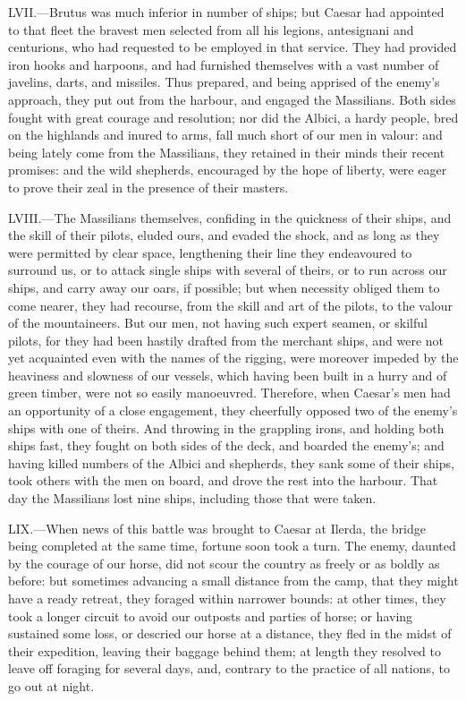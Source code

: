 LVII.—Brutus was much inferior in number of ships; but Caesar had
appointed to that fleet the bravest men selected from all his legions,
antesignani and centurions, who had requested to be employed in that
service. They had provided iron hooks and harpoons, and had furnished
themselves with a vast number of javelins, darts, and missiles. Thus
prepared, and being apprised of the enemy's approach, they put out from
the harbour, and engaged the Massilians. Both sides fought with great
courage and resolution; nor did the Albici, a hardy people, bred on the
highlands and inured to arms, fall much short of our men in valour: and
being lately come from the Massilians, they retained in their minds
their recent promises: and the wild shepherds, encouraged by the hope of
liberty, were eager to prove their zeal in the presence of their
masters.

LVIII.—The Massilians themselves, confiding in the quickness of their
ships, and the skill of their pilots, eluded ours, and evaded the shock,
and as long as they were permitted by clear space, lengthening their
line they endeavoured to surround us, or to attack single ships with
several of theirs, or to run across our ships, and carry away our oars,
if possible; but when necessity obliged them to come nearer, they had
recourse, from the skill and art of the pilots, to the valour of the
mountaineers. But our men, not having such expert seamen, or skilful
pilots, for they had been hastily drafted from the merchant ships, and
were not yet acquainted even with the names of the rigging, were
moreover impeded by the heaviness and slowness of our vessels, which
having been built in a hurry and of green timber, were not so easily
manoeuvred. Therefore, when Caesar's men had an opportunity of a close
engagement, they cheerfully opposed two of the enemy's ships with one of
theirs. And throwing in the grappling irons, and holding both ships
fast, they fought on both sides of the deck, and boarded the enemy's;
and having killed numbers of the Albici and shepherds, they sank some of
their ships, took others with the men on board, and drove the rest into
the harbour. That day the Massilians lost nine ships, including those
that were taken.

LIX.—When news of this battle was brought to Caesar at Ilerda, the
bridge being completed at the same time, fortune soon took a turn. The
enemy, daunted by the courage of our horse, did not scour the country as
freely or as boldly as before: but sometimes advancing a small distance
from the camp, that they might have a ready retreat, they foraged within
narrower bounds: at other times, they took a longer circuit to avoid our
outposts and parties of horse; or having sustained some loss, or
descried our horse at a distance, they fled in the midst of their
expedition, leaving their baggage behind them; at length they resolved
to leave off foraging for several days, and, contrary to the practice of
all nations, to go out at night.

